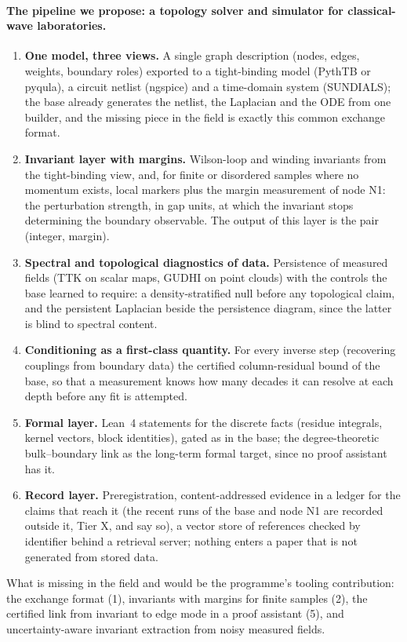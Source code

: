 \documentclass[11pt,a4paper]{article}
\begin{document}
\paragraph{The pipeline we propose: a topology solver and simulator for classical-wave laboratories.}
\begin{enumerate}
\item \textbf{One model, three views.} A single graph description (nodes, edges, weights, boundary roles) exported to a tight-binding model (PythTB or pyqula), a circuit netlist (ngspice) and a time-domain system (SUNDIALS); the base already generates the netlist, the Laplacian and the ODE from one builder, and the missing piece in the field is exactly this common exchange format.
\item \textbf{Invariant layer with margins.} Wilson-loop and winding invariants from the tight-binding view, and, for finite or disordered samples where no momentum exists, local markers plus the margin measurement of node N1: the perturbation strength, in gap units, at which the invariant stops determining the boundary observable. The output of this layer is the pair (integer, margin).
\item \textbf{Spectral and topological diagnostics of data.} Persistence of measured fields (TTK on scalar maps, GUDHI on point clouds) with the controls the base learned to require: a density-stratified null before any topological claim, and the persistent Laplacian beside the persistence diagram, since the latter is blind to spectral content.
\item \textbf{Conditioning as a first-class quantity.} For every inverse step (recovering couplings from boundary data) the certified column-residual bound of the base, so that a measurement knows how many decades it can resolve at each depth before any fit is attempted.
\item \textbf{Formal layer.} Lean~4 statements for the discrete facts (residue integrals, kernel vectors, block identities), gated as in the base; the degree-theoretic bulk--boundary link as the long-term formal target, since no proof assistant has it.
\item \textbf{Record layer.} Preregistration, content-addressed evidence in a ledger for the claims that reach it (the recent runs of the base and node N1 are recorded outside it, Tier X, and say so), a vector store of references checked by identifier behind a retrieval server; nothing enters a paper that is not generated from stored data.
\end{enumerate}
What is missing in the field and would be the programme's tooling contribution: the exchange format (1), invariants with margins for finite samples (2), the certified link from invariant to edge mode in a proof assistant (5), and uncertainty-aware invariant extraction from noisy measured fields.
\end{document}
